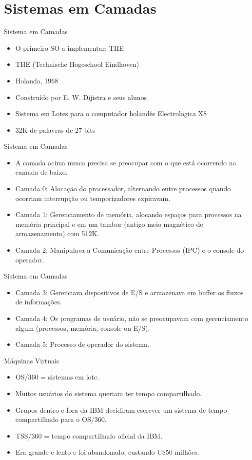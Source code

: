 \documentclass{beamer}
\begin{document}
\section{Sistemas em Camadas}
\begin{frame}{Sistema em Camadas}
    \begin{itemize}
        \item O primeiro SO a implementar: THE
        \item THE (Technische Hogeschool Eindhoven)
        \item Holanda, 1968
        \item Construído por E. W. Dijistra e seus alunos
        \item Sistema em Lotes para o computador holandês Electrologica X8
        \item 32K de palavras de 27 bits
    \end{itemize}
\end{frame}
\begin{frame}{Sistema em Camadas}
    \begin{itemize}
        \item A camada acima nunca precisa se preocupar com o que está ocorrendo na camada de baixo.
        \item Camada 0: Alocação do processador, alternando entre processos quando ocorriam interrupção ou temporizadores expiravam.
        \item Camada 1: Gerenciamento de memória, alocando espaços para processos na memória principal e em um tambor (antigo meio magnético de armazenamento) com 512K.
        \item Camada 2: Manipulava a Comunicação entre Processos (IPC) e o console do operador.
    \end{itemize}
\end{frame}
\begin{frame}{Sistema em Camadas}
    \begin{itemize}
       
        \item Camada 3: Gerenciava dispositivos de E/S e armazenava em buffer os fluxos de informações.
        \item Camada 4: Os programas de usuário, não se preocupavam com gerenciamento algum (processos, memória, console ou E/S).
        \item Camada 5: Processo de operador do sistema.
    \end{itemize}
\end{frame}
\begin{frame}{Máquinas Virtuais}
    \begin{itemize}
        \item OS/360 = sistemas em lote.
        \item Muitos usuários do sistema queriam ter tempo compartilhado.
        \item Grupos dentro e fora da IBM decidiram escrever um sistema de tempo compartilhado para o OS/360.
        \item TSS/360 = tempo compartilhado oficial da IBM.
        \item Era grande e lento e foi abandonado, custando U\$50 milhões.
    \end{itemize}
\end{frame}
\end{document}
